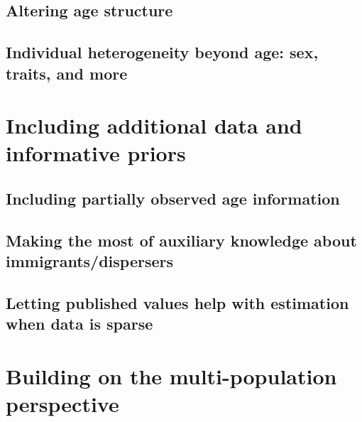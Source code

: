 \documentclass[
]{book}
\begin{document}
\hypertarget{altering-age-structure}{%
\subsection{Altering age structure}\label{altering-age-structure}}

\hypertarget{individual-heterogeneity-beyond-age-sex-traits-and-more}{%
\subsection{Individual heterogeneity beyond age: sex, traits, and more}\label{individual-heterogeneity-beyond-age-sex-traits-and-more}}

\hypertarget{including-additional-data-and-informative-priors}{%
\section{Including additional data and informative priors}\label{including-additional-data-and-informative-priors}}

\hypertarget{including-partially-observed-age-information}{%
\subsection{Including partially observed age information}\label{including-partially-observed-age-information}}

\hypertarget{making-the-most-of-auxiliary-knowledge-about-immigrantsdispersers}{%
\subsection{Making the most of auxiliary knowledge about immigrants/dispersers}\label{making-the-most-of-auxiliary-knowledge-about-immigrantsdispersers}}

\hypertarget{letting-published-values-help-with-estimation-when-data-is-sparse}{%
\subsection{Letting published values help with estimation when data is sparse}\label{letting-published-values-help-with-estimation-when-data-is-sparse}}

\hypertarget{building-on-the-multi-population-perspective}{%
\section{Building on the multi-population perspective}\label{building-on-the-multi-population-perspective}}
\end{document}
